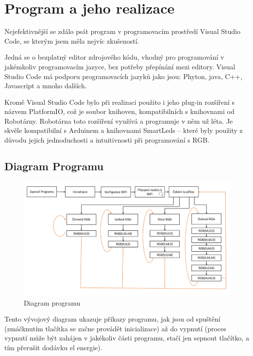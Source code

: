 \chapter{Program a jeho realizace}
Nejefektivnější se zdálo psát program v programovacím prostředí Visual Studio Code, se kterým jsem měla nejvíc zkušeností. 

Jedná se o bezplatný editor zdrojového kódu, vhodný pro programování v jakémkoliv programovacím jazyce, bez potřeby přepínání mezi editory. Visual Studio Code má podporu programovacích jazyků jako jsou: Phyton, java, C++, Javascript a mnoho dalších. 

Kromě Visual Studio Code bylo při realizaci použito i jeho plug-in rozšíření s názvem PlatformIO, což je soubor knihoven, kompatibilních s knihovnami od Robotárny. Robotárna toto rozšíření využívá a programuje v něm už léta.  Je skvěle kompatibilní s Arduinem a knihovnami SmartLeds – které byly použity z důvodu jejich jednoduchosti a intuitivnosti při programování s RGB.



\section{Diagram Programu }

\begin{figure}[htbp]
	\centering
	\includegraphics[width=1\textwidth]{img/04 prog/Diagram programu.png}
	\caption{Diagram programu}
\end{figure}

Tento vývojový diagram ukazuje příkazy programu, jak jsou od spuštění (zmáčknutím tlačítka se začne provádět inicializace) až do vypnutí (proces vypnutí může být zahájen v jakékoliv části programu, stačí jen sepnout tlačítko, a tím přerušit dodávku el energie). 
\newpage

